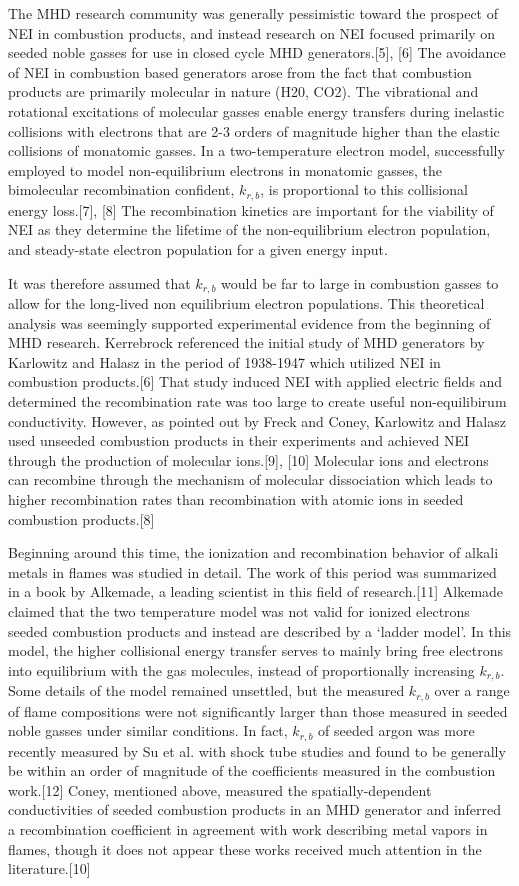 The MHD research community was generally pessimistic toward the prospect of NEI in combustion products, and instead research on NEI focused primarily on seeded noble gasses for use in closed cycle MHD generators.[5], [6] The avoidance of NEI in combustion based generators arose from the fact that combustion products are primarily molecular in nature (H20, CO2). The vibrational and rotational excitations of molecular gasses enable energy transfers during inelastic collisions with electrons that are 2-3 orders of magnitude higher than the elastic collisions of monatomic gasses. In a two-temperature electron model, successfully employed to model non-equilibrium electrons in monatomic gasses, the bimolecular recombination confident, $k_{r,b}$, is proportional to this collisional energy loss.[7], [8] The recombination kinetics are important for the viability of NEI as they determine the lifetime of the non-equilibrium electron population, and steady-state electron population for a given energy input. 

It was therefore assumed that $k_{r,b}$ would be far to large in combustion gasses to allow for the long-lived non equilibrium electron populations.
This theoretical analysis was seemingly supported experimental evidence from the beginning of MHD research. Kerrebrock referenced the initial study of MHD generators by Karlowitz and Halasz in the period of 1938-1947 which utilized NEI in combustion products.[6] That study induced NEI with applied electric fields and determined the recombination rate was too large to create useful non-equilibirum conductivity. However, as pointed out by Freck and Coney, Karlowitz and Halasz used unseeded combustion products in their experiments and achieved NEI through the production of molecular ions.[9], [10] Molecular ions and electrons can recombine through the mechanism of molecular dissociation  which leads to higher recombination rates than recombination with atomic ions in seeded combustion products.[8] 

Beginning around this time, the ionization and recombination behavior of alkali metals in flames was studied in detail. The work of this period was summarized in a book by Alkemade, a leading scientist in this field of research.[11] Alkemade claimed that the two temperature model was not valid for ionized electrons seeded combustion products and instead are described by a ‘ladder model’. In this model, the higher collisional energy transfer serves to mainly bring free electrons into equilibrium with the gas molecules, instead of proportionally increasing $k_{r,b}$. Some details of the model remained unsettled, but the measured $k_{r,b}$ over a range of flame compositions were not significantly larger than those measured in seeded noble gasses under similar conditions. In fact, $k_{r,b}$  of seeded argon was more recently measured by Su et al. with shock tube studies and found to be generally be within an order of magnitude of the coefficients measured in the combustion work.[12] Coney, mentioned above, measured the spatially-dependent conductivities of seeded combustion products in an MHD generator and inferred a recombination coefficient in agreement with work describing metal vapors in flames, though it does not appear these works received much attention in the literature.[10]

